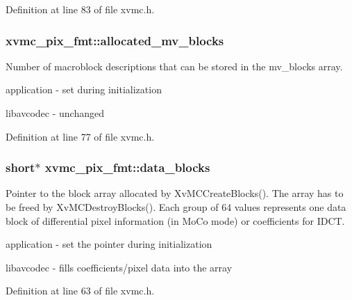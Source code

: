 Definition at line 83 of file xvmc.\+h.

\subsubsection[{\texorpdfstring{allocated\+\_\+mv\+\_\+blocks}{allocated_mv_blocks}}]{ xvmc\+\_\+pix\+\_\+fmt\+::allocated\+\_\+mv\+\_\+blocks}\hypertarget{structxvmc__pix__fmt_a7cd4533356f2d7c753d706be423fc9a8}{}\label{structxvmc__pix__fmt_a7cd4533356f2d7c753d706be423fc9a8}
Number of macroblock descriptions that can be stored in the mv\+\_\+blocks array.
\begin{DoxyItemize}
\item application -\/ set during initialization
\item libavcodec -\/ unchanged 
\end{DoxyItemize}

Definition at line 77 of file xvmc.\+h.

\subsubsection[{\texorpdfstring{data\+\_\+blocks}{data_blocks}}]{\setlength{\rightskip}{0pt plus 5cm}short$\ast$ xvmc\+\_\+pix\+\_\+fmt\+::data\+\_\+blocks}\hypertarget{structxvmc__pix__fmt_a194ffdefda2917100cedd71ce3ae6877}{}\label{structxvmc__pix__fmt_a194ffdefda2917100cedd71ce3ae6877}
Pointer to the block array allocated by Xv\+M\+C\+Create\+Blocks(). The array has to be freed by Xv\+M\+C\+Destroy\+Blocks(). Each group of 64 values represents one data block of differential pixel information (in Mo\+Co mode) or coefficients for I\+D\+CT.
\begin{DoxyItemize}
\item application -\/ set the pointer during initialization
\item libavcodec -\/ fills coefficients/pixel data into the array 
\end{DoxyItemize}

Definition at line 63 of file xvmc.\+h.

